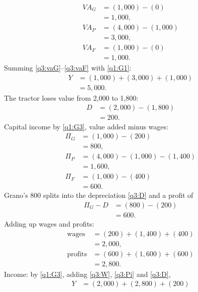 \begin{sol}
\begin{align}
VA_G &= (1{,}000)-(0) \nonumber\\
&= 1{,}000, \label{q3:vaG}\\
VA_P &= (4{,}000)-(1{,}000) \nonumber\\
&= 3{,}000, \label{q3:vaP}\\
VA_F &= (1{,}000)-(0) \nonumber\\
&= 1{,}000. \label{q3:vaF}
\end{align}
Summing \eqref{q3:vaG}--\eqref{q3:vaF} with \eqref{q1:G1}:
\begin{align}
Y &= (1{,}000)+(3{,}000)+(1{,}000) \nonumber\\
&= 5{,}000. \label{q3:Y}
\end{align}
The tractor loses value from 2{,}000 to 1{,}800:
\begin{align}
D &= (2{,}000)-(1{,}800) \nonumber\\
&= 200. \label{q3:D}
\end{align}
Capital income by \eqref{q1:G3}, value added minus wages:
\begin{align*}
\Pi_G &= (1{,}000)-(200)\\
&= 800,\\
\Pi_P &= (4{,}000)-(1{,}000)-(1{,}400)\\
&= 1{,}600,\\
\Pi_F &= (1{,}000)-(400)\\
&= 600.
\end{align*}
Grano's 800 splits into the depreciation \eqref{q3:D} and a profit of
\begin{align*}
\Pi_G-D &= (800)-(200)\\
&= 600 .
\end{align*}
Adding up wages and profits:
\begin{align}
\text{wages} &= (200)+(1{,}400)+(400) \nonumber\\
&= 2{,}000, \label{q3:W}\\
\text{profits} &= (600)+(1{,}600)+(600) \nonumber\\
&= 2{,}800. \label{q3:Pi}
\end{align}
Income: by \eqref{q1:G3}, adding \eqref{q3:W}, \eqref{q3:Pi} and \eqref{q3:D},
\begin{align*}
Y &= (2{,}000)+(2{,}800)+(200)\\

\end{align*}
\end{sol}
